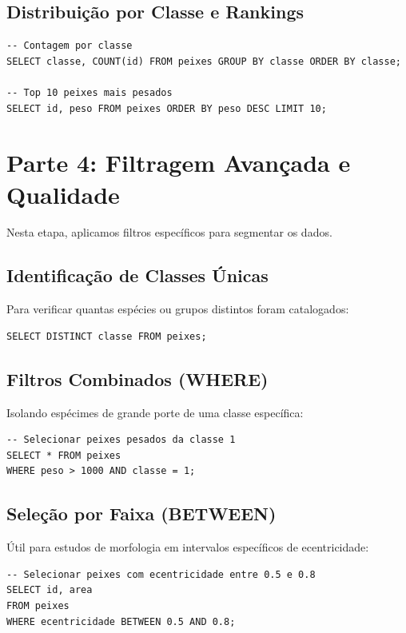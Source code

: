 \documentclass[12pt]{article}
\begin{document}
\subsection*{Distribuição por Classe e Rankings}
\begin{lstlisting}
-- Contagem por classe
SELECT classe, COUNT(id) FROM peixes GROUP BY classe ORDER BY classe;

-- Top 10 peixes mais pesados
SELECT id, peso FROM peixes ORDER BY peso DESC LIMIT 10;
\end{lstlisting}

\vspace{0.5cm}

\section*{Parte 4: Filtragem Avançada e Qualidade}
Nesta etapa, aplicamos filtros específicos para segmentar os dados.

\subsection*{Identificação de Classes Únicas}
Para verificar quantas espécies ou grupos distintos foram catalogados:
\begin{lstlisting}
SELECT DISTINCT classe FROM peixes;
\end{lstlisting}

\subsection*{Filtros Combinados (WHERE)}
Isolando espécimes de grande porte de uma classe específica:
\begin{lstlisting}
-- Selecionar peixes pesados da classe 1
SELECT * FROM peixes 
WHERE peso > 1000 AND classe = 1;
\end{lstlisting}

\subsection*{Seleção por Faixa (BETWEEN)}
Útil para estudos de morfologia em intervalos específicos de ecentricidade:
\begin{lstlisting}
-- Selecionar peixes com ecentricidade entre 0.5 e 0.8
SELECT id, area 
FROM peixes 
WHERE ecentricidade BETWEEN 0.5 AND 0.8;
\end{lstlisting}

\vspace{1.0cm}
\end{document}
